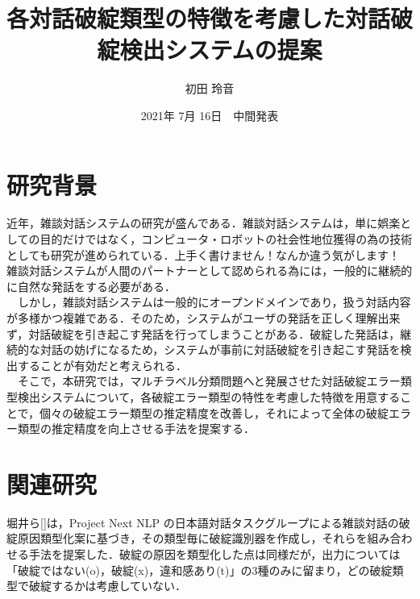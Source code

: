 \documentclass[upLaTex, 10pt,dvipdfmx,a4paper,twocolumn]{jsarticle}
\begin{document}
\title{各対話破綻類型の特徴を考慮した対話破綻検出システムの提案}
\author{初田 玲音}
\date{2021年 7月 16日　中間発表}


\maketitle

\section{研究背景}
    近年，雑談対話システムの研究が盛んである．雑談対話システムは，単に娯楽としての目的だけではなく，コンピュータ・ロボットの社会性地位獲得の為の技術としても研究が進められている．上手く書けません！なんか違う気がします！　雑談対話システムが人間のパートナーとして認められる為には，一般的に継続的に自然な発話をする必要がある．\\
    　しかし，雑談対話システムは一般的にオープンドメインであり，扱う対話内容が多様かつ複雑である．そのため，システムがユーザの発話を正しく理解出来ず，対話破綻を引き起こす発話を行ってしまうことがある．破綻した発話は，継続的な対話の妨げになるため，システムが事前に対話破綻を引き起こす発話を検出することが有効だと考えられる．\\
    　そこで，本研究では，マルチラベル分類問題へと発展させた対話破綻エラー類型検出システムについて，各破綻エラー類型の特性を考慮した特徴を用意することで，個々の破綻エラー類型の推定精度を改善し，それによって全体の破綻エラー類型の推定精度を向上させる手法を提案する．

\section{関連研究}
    堀井ら[]は，Project Next NLP の日本語対話タスクグループによる雑談対話の破綻原因類型化案に基づき，その類型毎に破綻識別器を作成し，それらを組み合わせる手法を提案した．破綻の原因を類型化した点は同様だが，出力については「破綻ではない(o)，破綻(x)，違和感あり(t)」の3種のみに留まり，どの破綻類型で破綻するかは考慮していない．\\
    
\end{document}
